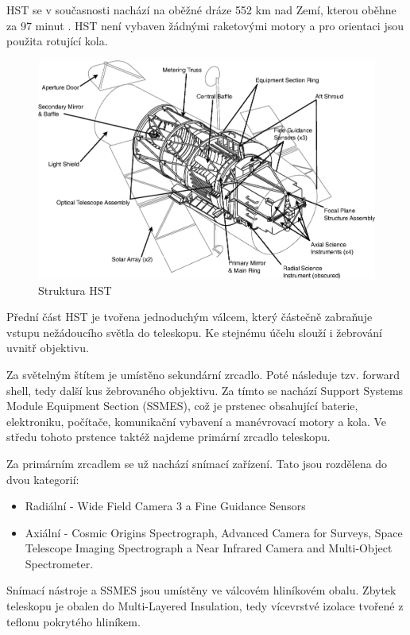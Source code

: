 \documentclass[a4paper,11pt]{article}
\begin{document}
HST se v současnosti nachází na oběžné dráze 552 km nad Zemí, kterou oběhne za 97 minut \cite{hubblesiteFacts}. HST není vybaven žádnými raketovými motory a pro orientaci jsou použita rotující kola.

\begin{figure}[h]
	\begin{center}
		\includegraphics[width=16cm]{hst-structure.png}
		\caption{Struktura HST}
		\label{hst-structure}
	\end{center}
\end{figure}

Přední část HST je tvořena jednoduchým válcem, který částečně zabraňuje vstupu nežádoucího světla do teleskopu. Ke stejnému účelu slouží i žebrování uvnitř objektivu.

Za světelným štítem je umístěno sekundární zrcadlo. Poté následuje tzv. forward shell, tedy další kus žebrovaného objektivu. Za tímto se nachází Support Systems Module Equipment Section (SSMES), což je prstenec obsahující baterie, elektroniku, počítače, komunikační vybavení a manévrovací motory a kola. Ve středu tohoto prstence taktéž najdeme primární zrcadlo teleskopu.

Za primárním zrcadlem se už nachází snímací zařízení. Tato jsou rozdělena do dvou kategorií:
\begin{itemize}
	\item Radiální - Wide Field Camera 3 a Fine Guidance Sensors
	\item Axiální - Cosmic Origins Spectrograph, Advanced Camera for Surveys, Space Telescope Imaging Spectrograph a Near Infrared Camera and Multi-Object Spectrometer.
\end{itemize}

Snímací nástroje a SSMES jsou umístěny ve válcovém hliníkovém obalu. Zbytek teleskopu je obalen do Multi-Layered Insulation, tedy vícevrstvé izolace tvořené z teflonu pokrytého hliníkem.
\end{document}
